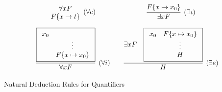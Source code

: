\begin{definition}
\begin{table}[hbt]
	\begin{gather*}
	\begin{array}{ccc}
	\infer[(\forall e)]{F\{x\to t\}}{
		\forall x F
	}
	&&
		\infer[(\exists i)]{\exists x F}{
		F\{x\mapsto x_0 \}
	}
	\\[1em]
	\infer[(\forall i)]{\forall x F}{
		\boxed{\begin{array}{cc}x_0\\&\vdots\\&F\{x\mapsto x_0\}\end{array}}
	}
	&&
	\infer[(\exists e)]{H}{
		\exists x F &
		\boxed{\begin{array}{cc}x_0&F\{x\mapsto x_0 \}\\&\vdots\\&H\end{array}}
	}
	\end{array}
	\end{gather*}
	\caption{Natural Deduction Rules for Quantifiers}
	\label{tab:natural:deduction:quantifiers}
\end{table}
\end{definition}
